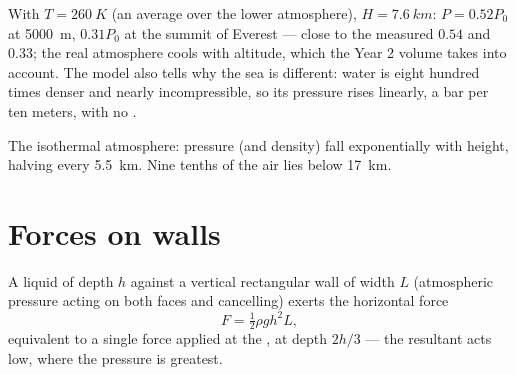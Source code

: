 \begin{example}\label{ex:b1:fluid-statics:altitude}
With $T = \qty{260}{K}$ (an average over the lower atmosphere), $H =
\qty{7.6}{km}$: $P = 0.52P_0$ at \qty{5000}{m}, $0.31P_0$ at the summit of
Everest --- close to the measured $0.54$ and $0.33$; the real atmosphere
cools with altitude, which the Year 2 volume takes into account. The
model also tells why the sea is different: water is eight hundred times
denser and nearly incompressible, so its pressure rises linearly, a bar
per ten meters, with no .
\end{example}

\begin{omfigure}

{\small The isothermal atmosphere: pressure (and density) fall
exponentially with height, halving every \qty{5.5}{km}. Nine tenths of
the air lies below \qty{17}{km}.}
\end{omfigure}

\section{Forces on walls}

\begin{proposition}\label{prop:b1:fluid-statics:wall}
A liquid of depth $h$ against a vertical rectangular wall of width $L$
(atmospheric pressure acting on both faces and cancelling) exerts the
horizontal force
\[
F = \tfrac12\rho gh^2L ,
\]
equivalent to a single force applied at the \emph{},
at depth $2h/3$ --- the resultant acts low, where the pressure is
greatest.
\end{proposition}


